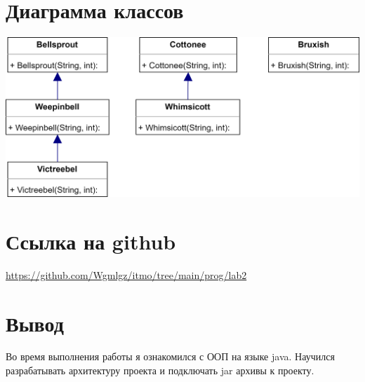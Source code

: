\section*{Диаграмма классов}

\begin{center}
  \includegraphics[scale=0.2]{diagram.png}
\end{center}

\section*{Ссылка на github}
\url{https://github.com/Wgmlgz/itmo/tree/main/prog/lab2}

\section*{Вывод}
Во время выполнения работы я ознакомился с ООП на языке java. Научился разрабатывать архитектуру проекта и подключать jar архивы к проекту.

